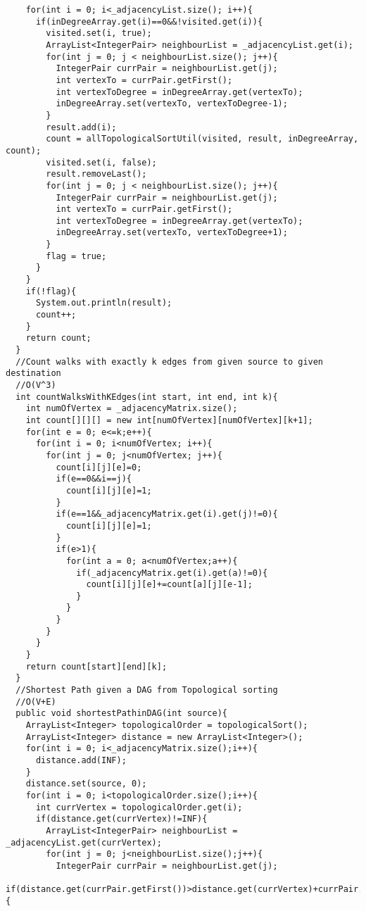 \documentclass[11pt]{article}
\theoremstyle{definition}
\begin{document}
\begin{verbatim}
    for(int i = 0; i<_adjacencyList.size(); i++){
      if(inDegreeArray.get(i)==0&&!visited.get(i)){
        visited.set(i, true);
        ArrayList<IntegerPair> neighbourList = _adjacencyList.get(i);
        for(int j = 0; j < neighbourList.size(); j++){
          IntegerPair currPair = neighbourList.get(j);
          int vertexTo = currPair.getFirst();
          int vertexToDegree = inDegreeArray.get(vertexTo);
          inDegreeArray.set(vertexTo, vertexToDegree-1);
        }
        result.add(i);
        count = allTopologicalSortUtil(visited, result, inDegreeArray, count);
        visited.set(i, false);
        result.removeLast();
        for(int j = 0; j < neighbourList.size(); j++){
          IntegerPair currPair = neighbourList.get(j);
          int vertexTo = currPair.getFirst();
          int vertexToDegree = inDegreeArray.get(vertexTo);
          inDegreeArray.set(vertexTo, vertexToDegree+1);
        }
        flag = true;
      }
    }
    if(!flag){
      System.out.println(result);
      count++;
    }
    return count;
  }
  //Count walks with exactly k edges from given source to given destination
  //O(V^3)
  int countWalksWithKEdges(int start, int end, int k){
    int numOfVertex = _adjacencyMatrix.size();
    int count[][][] = new int[numOfVertex][numOfVertex][k+1];
    for(int e = 0; e<=k;e++){
      for(int i = 0; i<numOfVertex; i++){
        for(int j = 0; j<numOfVertex; j++){
          count[i][j][e]=0;
          if(e==0&&i==j){
            count[i][j][e]=1;
          }
          if(e==1&&_adjacencyMatrix.get(i).get(j)!=0){
            count[i][j][e]=1;
          }
          if(e>1){
            for(int a = 0; a<numOfVertex;a++){
              if(_adjacencyMatrix.get(i).get(a)!=0){
                count[i][j][e]+=count[a][j][e-1];
              }
            }
          }
        }
      }
    }
    return count[start][end][k];
  }
  //Shortest Path given a DAG from Topological sorting
  //O(V+E)
  public void shortestPathinDAG(int source){
    ArrayList<Integer> topologicalOrder = topologicalSort();
    ArrayList<Integer> distance = new ArrayList<Integer>();
    for(int i = 0; i<_adjacencyMatrix.size();i++){
      distance.add(INF);
    }
    distance.set(source, 0);
    for(int i = 0; i<topologicalOrder.size();i++){
      int currVertex = topologicalOrder.get(i);
      if(distance.get(currVertex)!=INF){
        ArrayList<IntegerPair> neighbourList = _adjacencyList.get(currVertex);
        for(int j = 0; j<neighbourList.size();j++){
          IntegerPair currPair = neighbourList.get(j);
          if(distance.get(currPair.getFirst())>distance.get(currVertex)+currPair.getSecond()){

\end{verbatim}
\end{document}
